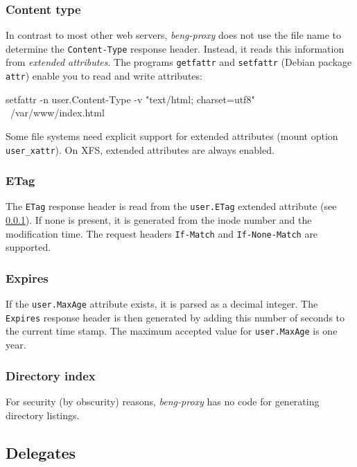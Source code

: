 \documentclass[a4paper,12pt]{article}
\begin{document}
\subsubsection{Content type}

\label{xattr}

In contrast to most other web servers, \emph{beng-proxy} does not use
the file name to determine the \texttt{Content-Type} response header.
Instead, it reads this information from \textit{extended attributes}.
The programs \texttt{getfattr} and \texttt{setfattr} (Debian package
\texttt{attr}) enable you to read and write attributes:

\begin{verbatim*}
setfattr -n user.Content-Type -v "text/html; charset=utf8" \
/var/www/index.html
\end{verbatim*}

Some file systems need explicit support for extended attributes (mount
option \texttt{user\_xattr}).  On
XFS, extended attributes are always enabled.

\subsubsection{ETag}

The \texttt{ETag} response header is read from the \texttt{user.ETag}
extended attribute (see \ref{xattr}).  If none is present, it is
generated from the inode number and the modification time.  The request
headers \texttt{If-Match} and \texttt{If-None-Match} are supported.

\subsubsection{Expires}

If the \texttt{user.MaxAge} attribute exists, it is parsed as a
decimal integer.  The \texttt{Expires} response header is then
generated by adding this number of seconds to the current time stamp.
The maximum accepted value for \texttt{user.MaxAge} is one year.

\subsubsection{Directory index}

For security (by obscurity) reasons, \emph{beng-proxy} has no code for
generating directory listings.

\subsection{Delegates}
\label{delegate}
\end{document}
